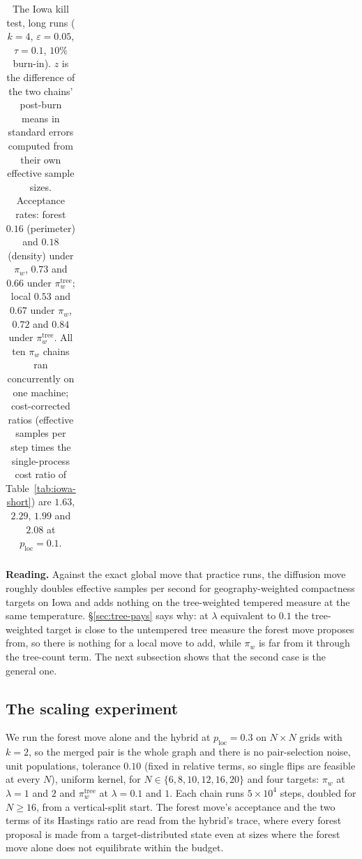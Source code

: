 \documentclass[11pt]{article}
\begin{document}
\begin{table}[htbp]
\begin{tabular}{llrrrrrrrr}
\bottomrule
\end{tabular}
\caption{The Iowa kill test, long runs ($k = 4$,
  $\varepsilon = 0.05$, $\tau = 0.1$, $10\%$ burn-in). $z$ is the
  difference of the two chains' post-burn means in standard errors
  computed from their own effective sample sizes. Acceptance rates:
  forest $0.16$ (perimeter) and $0.18$ (density) under $\pi_w$,
  $0.73$ and $0.66$ under $\pi_w^{\mathrm{tree}}$; local $0.53$ and
  $0.67$ under $\pi_w$, $0.72$ and $0.84$ under
  $\pi_w^{\mathrm{tree}}$. All ten $\pi_w$ chains ran concurrently on
  one machine; cost-corrected ratios (effective samples per step
  times the single-process cost ratio of Table~\ref{tab:iowa-short})
  are $1.63$, $2.29$, $1.99$ and $2.08$ at
  $p_{\mathrm{loc}} = 0.1$.}\label{tab:iowa-long}
\end{table}

\textbf{Reading.} Against the exact global move that practice runs,
the diffusion move roughly doubles effective samples per second for
geography-weighted compactness targets on Iowa and adds nothing on
the tree-weighted tempered measure at the same temperature.
\S\ref{sec:tree-pays} says why: at $\lambda$ equivalent to $0.1$ the
tree-weighted target is close to the untempered tree measure the
forest move proposes from, so there is nothing for a local move to
add, while $\pi_w$ is far from it through the tree-count term. The
next subsection shows that the second case is the general one.

\subsection{The scaling experiment}\label{sec:exp-scaling}

We run the forest move alone and the hybrid at $p_{\mathrm{loc}} = 0.3$
on $N \times N$ grids with $k = 2$, so the merged pair is the whole
graph and there is no pair-selection noise, unit populations,
tolerance $0.10$ (fixed in relative terms, so single flips are
feasible at every $N$), uniform kernel, for $N \in \{6, 8, 10, 12,
16, 20\}$ and four targets: $\pi_w$ at $\lambda = 1$ and $2$ and
$\pi_w^{\mathrm{tree}}$ at $\lambda = 0.1$ and $1$. Each chain runs
$5 \times 10^4$ steps, doubled for $N \ge 16$, from a vertical-split
start. The forest move's acceptance and the two terms of its Hastings
ratio are read from the hybrid's trace, where every forest proposal is
made from a target-distributed state even at sizes where the forest
move alone does not equilibrate within the budget.
\end{document}
